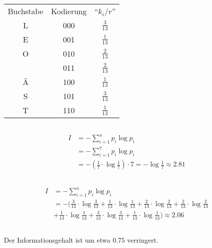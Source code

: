 \documentclass{article}
\begin{document}
\section{}
\subsection{}
\begin{tabular}{c|c|c}
    Buchstabe&Kodierung&``$k_i/r$''\\
    L&000&$\frac{3}{13}$\\
    E&001&$\frac{1}{13}$\\
    O&010&$\frac{2}{13}$\\
     &011&$\frac{2}{13}$\\
    Ä&100&$\frac{1}{13}$\\
    S&101&$\frac{3}{13}$\\
    T&110&$\frac{1}{13}$
\end{tabular}
\subsection{}
\begin{align*}
    I &= -\sum_{i=1}^n p_i \log p_i\\
    &= -\sum_{i=1}^7 p_i \log p_i\\
    &= -(\frac{1}{7} \cdot \log\frac{1}{7}) \cdot 7 = -\log\frac{1}{7}
    \approx 2.81
\end{align*}
\subsection{}
\begin{align*}
    I &= -\sum_{i=1}^n p_i \log p_i\\
    &= -(\frac{3}{13}\cdot\log\frac{3}{13}
    +\frac{1}{13}\cdot\log\frac{1}{13}
    +\frac{2}{13}\cdot\log\frac{2}{13}
    +\frac{2}{13}\cdot\log\frac{2}{13}\\
    &+\frac{1}{13}\cdot\log\frac{1}{13}
    +\frac{3}{13}\cdot\log\frac{3}{13}
    +\frac{1}{13}\cdot\log\frac{1}{13})
    \approx 2.06
\end{align*}
\subsection{}
Der Informationsgehalt ist um etwa $0.75$ verringert.
\subsection{}
\end{document}
